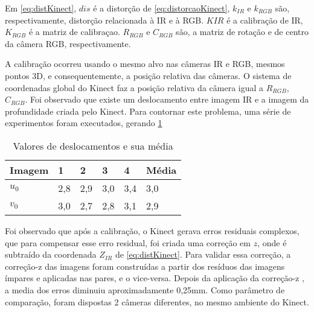 Em \ref{eq:distKinect}, $dis$ é a distorção de \ref{eq:distorcaoKinect}, $k_{IR}$ e $k_{RGB}$ são, respectivamente, distorção relacionada à IR e à RGB. 
$K{IR}$ é a calibração de IR, $K_{RGB}$ é a matriz de calibraçao. $R_{RGB}$ e $C_{RGB}$ são, a matriz de rotação e de centro da câmera RGB, respectivamente.

A calibração ocorreu usando o mesmo alvo nas câmeras IR e RGB, mesmos pontos 3D, e consequentemente, a posição relativa das câmeras.
O sistema de coordenadas global do Kinect faz a posição relativa da câmera igual a $R_{RGB}$, $C_{RGB}$.
Foi observado que existe um deslocamento entre imagem IR e a imagem da profundidade criada pelo Kinect. Para contornar este problema, uma série de experimentos foram executados, gerando \ref{tab:deslocamentoKinect}

\begin{table}[]
\centering
\caption{Valores de deslocamentos e sua média}
\label{tab:deslocamentoKinect}
\begin{tabular}{|l|l|l|l|l|l|}
\hline
Imagem & 1   & 2   & 3   & 4   & Média \\ \hline
$u_0$  & 2,8 & 2,9 & 3,0 & 3,4 & 3,0   \\ \hline
$v_0$  & 3,0 & 2,7 & 2,8 & 3,1 & 2,9   \\ \hline
\end{tabular}
\end{table}


Foi observado que após a calibração, o Kinect gerava erros residuais complexos, que para compensar esse erro residual, foi criada uma correção em $z$, onde é subtraído da coordenada $Z_{IR}$ de \ref{eq:distKinect}.
Para validar essa correção, a correção-z das imagens foram construídas a partir dos resíduos das imagens ímpares e aplicadas nas pares, e o vice-versa. Depois da aplicação da correção-z , a media dos erros diminuiu aproximadamente 0,25mm.
Como parâmetro de comparação, foram dispostas 2 câmeras diferentes, no mesmo ambiente do Kinect.


%

